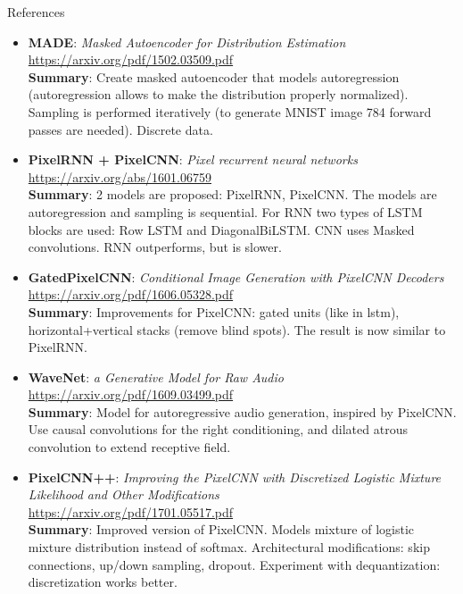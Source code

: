 \documentclass{beamer}
\begin{document}
\begin{frame}{References}
{\tiny
\begin{itemize}
	\item \textbf{MADE}: \textit{Masked Autoencoder for Distribution Estimation} \\
	\href{https://arxiv.org/pdf/1502.03509.pdf}{https://arxiv.org/pdf/1502.03509.pdf} \\
	\textbf{Summary}: Create masked autoencoder that models autoregression (autoregression allows to make the distribution properly normalized). Sampling is performed iteratively (to generate MNIST image 784 forward passes are needed). Discrete data.
	
	\item \textbf{PixelRNN + PixelCNN}: \textit{Pixel recurrent neural networks} \\
	\href{https://arxiv.org/abs/1601.06759}{https://arxiv.org/abs/1601.06759} \\
	\textbf{Summary}: 2 models are proposed: PixelRNN, PixelCNN. The models are autoregression and sampling is sequential. For RNN two types of LSTM blocks are used: Row LSTM and DiagonalBiLSTM. CNN uses Masked convolutions. RNN outperforms, but is slower.
	
	\item \textbf{GatedPixelCNN}: \textit{Conditional Image Generation with PixelCNN Decoders} \\
	\href{https://arxiv.org/pdf/1606.05328.pdf}{https://arxiv.org/pdf/1606.05328.pdf} \\
	\textbf{Summary}: Improvements for PixelCNN: gated units (like in lstm), horizontal+vertical stacks (remove blind spots). The result is now similar to PixelRNN.
	
	\item \textbf{WaveNet}: \textit{a Generative Model for Raw Audio} \\
	\href{https://arxiv.org/pdf/1609.03499.pdf}{https://arxiv.org/pdf/1609.03499.pdf} \\
	\textbf{Summary}: Model for autoregressive audio generation, inspired by PixelCNN. Use causal convolutions for the right conditioning, and dilated atrous convolution to extend receptive field.
	
	\item \textbf{PixelCNN++}: \textit{Improving the PixelCNN with Discretized Logistic Mixture Likelihood and Other Modifications} \\
	\href{https://arxiv.org/pdf/1701.05517.pdf}{https://arxiv.org/pdf/1701.05517.pdf} \\
	\textbf{Summary}: Improved version of PixelCNN. Models mixture of logistic mixture distribution instead of softmax. Architectural modifications: skip connections, up/down sampling, dropout. Experiment with dequantization: discretization works better.
	

\end{itemize}}
\end{frame}
\end{document}
